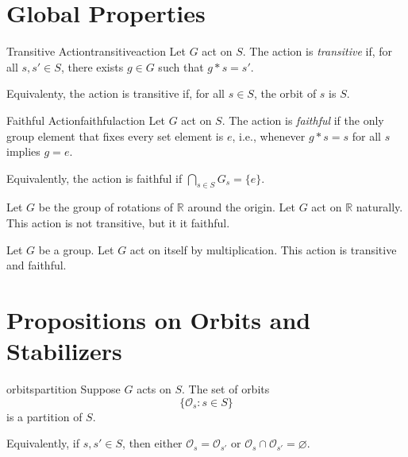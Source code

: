 \section{Global Properties}


\begin{defn}{Transitive Action}{transitiveaction}
  Let \(G\) act on \(S\).
  The action is \emph{transitive} if, for all \(s, s' \in S\), there exists \(g \in G\) such that \(g * s = s'\).

  Equivalenty, the action is transitive if, for all \(s \in S\), the orbit of \(s\) is \(S\).
\end{defn}

\begin{defn}{Faithful Action}{faithfulaction}
  Let \(G\) act on \(S\).
  The action is \emph{faithful} if the only group element that fixes every set element is \(e\), i.e., whenever \(g * s = s\) for all \(s\) implies \(g = e\).

  Equivalently, the action is faithful if \(\bigcap_{s\in S} G_s = \{e\}\).
\end{defn}

\begin{exmp}{}{}
  Let \(G\) be the group of rotations of \(\mathbb{R}\) around the origin. Let \(G\) act on \(\mathbb{R}\) naturally.
  This action is not transitive, but it it faithful.
\end{exmp}

\begin{exmp}{}{}
  Let \(G\) be a group. Let \(G\) act on itself by multiplication.
  This action is transitive and faithful.
\end{exmp}

\section{Propositions on Orbits and Stabilizers}

\begin{prop}{}{orbitspartition}
  Suppose \(G\) acts on \(S\). The set of orbits \[
    \{\mathcal{O}_s : s \in S\}
  \] is a partition of \(S\).

  Equivalently, if \(s, s' \in S\), then either \(\mathcal{O}_s = \mathcal{O}_{s'}\) or  \(\mathcal{O}_s \cap \mathcal{O}_{s'} = \varnothing\).
\end{prop}

